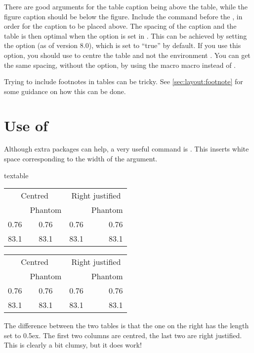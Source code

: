 There are good arguments for the table caption being above the table,
while the figure caption should be below the figure.
Include the  command before the ,
in order for the caption to be placed above.
The spacing of the caption and the table is then optimal
when the option 
is set in \KOMAScript.
This can be achieved by setting the option  (as of version 8.0), which is set to \enquote{true} by default.
If you use this option, you should use  to centre the table
and not the environment .
You can get the same spacing, without the  option,
by using the macro  macro instead of .

Trying to include footnotes in tables can be tricky.
See \cref{sec:layout:footnote} for some guidance on how this can be done.


\section{Use of \texorpdfstring{}{phantom}}%
\label{sec:table:phantom}

Although extra packages can help, a very useful command is
. This inserts white space corresponding to the width
of the argument. 

\begin{tcblisting}{textable}
\centering
\begin{tabular}{cc | rr}
  \multicolumn{2}{c|}{Centred} &
  \multicolumn{2}{c}{Right justified} \\
  & Phantom & & Phantom\\
  \midrule
  0.76 & \phantom{0}0.76 & 0.76 & 0.76\\
  83.1 & 83.1\phantom{0} & 83.1 & 83.1\phantom{0}
\end{tabular}
\qquad
{\setlength{\extrarowheight}{0.5ex}
\centering
\begin{tabular}{cc|rr}
  \multicolumn{2}{c|}{Centred} &
  \multicolumn{2}{c}{Right justified} \\
  & Phantom & & Phantom\\
  \midrule
  0.76 & \phantom{0}0.76 & 0.76 & 0.76\\
  83.1 & 83.1\phantom{0} & 83.1 & 83.1\phantom{0}
\end{tabular}
}
\end{tcblisting}
\par\noindent
The difference between the two tables is that the one on the right
has the length  set to 0.5ex.
The first two columns are centred, the last two are right justified.
This is clearly a bit clumsy, but it does work!


